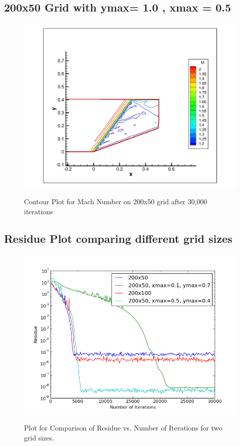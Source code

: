 \documentclass{article}
\begin{document}
\subsection*{200x50 Grid with ymax= 1.0 , xmax = 0.5 }
\begin{figure}[H]   \label{figure}
\includegraphics[width=14cm]{05x04/grid50.jpg}		%
\label{figure:}
\caption{Contour Plot for Mach Number on 200x50 grid after 30,000 iterations}
\end{figure}
\newpage


\newpage
\subsection*{Residue Plot comparing different grid sizes}
\begin{figure}[H]   \label{figure}
\includegraphics[width=15cm]{residue.png}		%
\label{figure:}
\caption{Plot for Comparison of Residue vs. Number of Iterations for two grid sizes.}
\end{figure}
\end{document}
